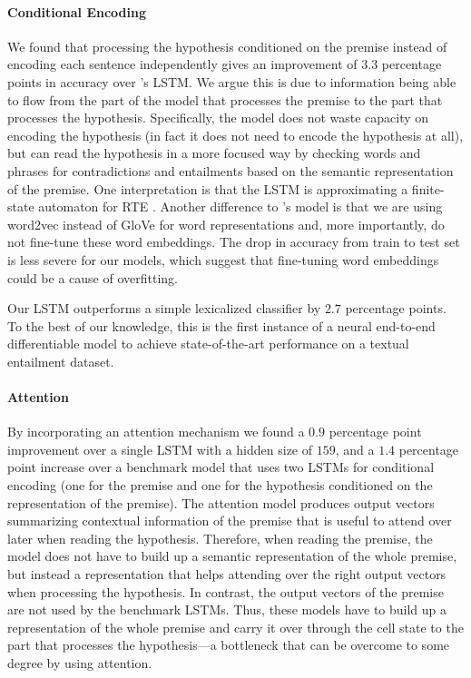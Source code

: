 \documentclass{article}
\begin{document}
\paragraph{Conditional Encoding}
We found that processing the hypothesis conditioned on the premise instead of encoding each sentence independently gives an improvement of $3.3$ percentage points in accuracy over \citeauthor{bowman2015large}'s LSTM.
We argue this is due to information being able to flow from the part of the model that processes the premise to the part that processes the hypothesis.
Specifically, the model does not waste capacity on encoding the hypothesis (in fact it does not need to encode the hypothesis at all), but can read the hypothesis in a more focused way by checking words and phrases for contradictions and entailments based on the semantic representation of the premise.
One interpretation is that the LSTM is approximating a finite-state automaton for RTE \cite[cf.][]{angeli2014naturalli}.
Another difference to \citeauthor{bowman2015large}'s model is that we are using word2vec instead of GloVe for word representations and, more importantly, do not fine-tune these word embeddings.
The drop in accuracy from train to test set is less severe for our models, which suggest that fine-tuning word embeddings could be a cause of overfitting.


Our LSTM outperforms a simple lexicalized classifier by $2.7$ percentage points.
To the best of our knowledge, this is the first instance of a neural end-to-end differentiable model to achieve state-of-the-art performance on a textual entailment dataset.

\paragraph{Attention} By incorporating an attention mechanism we found a $0.9$ percentage point improvement over a single LSTM with a hidden size of $159$, and a $1.4$ percentage point increase over a benchmark model that uses two LSTMs for conditional encoding (one for the premise and one for the hypothesis conditioned on the representation of the premise).
The attention model produces output vectors summarizing contextual information of the premise that is useful to attend over later when reading the hypothesis.
Therefore, when reading the premise, the model does not have to build up a semantic representation of the whole premise, but instead a representation that helps attending over the right output vectors when processing the hypothesis.
In contrast, the output vectors of the premise are not used by the benchmark LSTMs.
Thus, these models have to build up a representation of the whole premise and carry it over through the cell state to the part that processes the hypothesis---a bottleneck that can be overcome to some degree by using attention.
\end{document}
